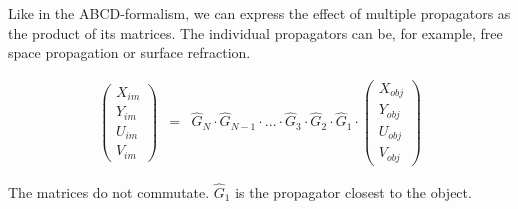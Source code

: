 \documentclass[12pt,a4paper,twoside,openright,BCOR10mm,headsepline,titlepage,abstracton,chapterprefix,final]{scrreprt}
\begin{document}
Like in the ABCD-formalism, we can express the effect of multiple propagators as the product of its matrices.
The individual propagators can be, for example, free space propagation or surface refraction.

\begin{eqnarray}
 \begin{pmatrix}
  X_{im} \\ Y_{im} \\ U_{im} \\ V_{im}
 \end{pmatrix}
 &=&
 \hat{G}_N \cdot \hat{G}_{N-1} \cdot ... \cdot \hat{G}_3 \cdot \hat{G}_2 \cdot \hat{G}_1 \cdot
 \begin{pmatrix}
  X_{obj} \\ Y_{obj} \\ U_{obj} \\ V_{obj}
 \end{pmatrix}
\end{eqnarray}

The matrices do not commutate. $\hat{G}_1$ is the propagator closest to the object.
\end{document}
